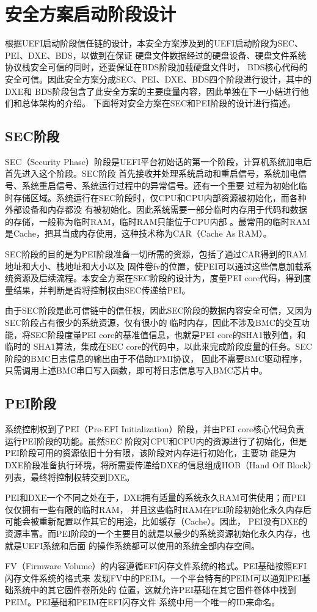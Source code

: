 %
%
\section{安全方案启动阶段设计}
根据UEFI启动阶段信任链的设计，本安全方案涉及到的UEFI启动阶段为SEC、PEI、DXE、BDS，以做到在保证
硬盘文件数据经过的硬盘设备、硬盘文件系统协议栈安全可信的同时，还要保证在BDS阶段加载硬盘文件时，
BDS核心代码的安全可信。因此安全方案分成SEC、PEI、DXE、BDS四个阶段进行设计\cite{english1}，其中的DXE和
BDS阶段包含了此安全方案的主要度量内容，因此单独在下一小结进行他们和总体架构的介绍。
下面将对安全方案在SEC和PEI阶段的设计进行描述。

\subsection{SEC阶段}
SEC（Security Phase）阶段是UEFI平台初始话的第一个阶段，计算机系统加电后首先进入这个阶段。SEC阶段
首先接收并处理系统启动和重启信号，系统加电信号、系统重启信号、系统运行过程中的异常信号。还有一个重要
过程为初始化临时存储区域。系统运行在SEC阶段时，仅CPU和CPU内部资源被初始化，而各种外部设备和内存都没
有被初始化。因此系统需要一部分临时内存用于代码和数据的存储，一般称为临时RAM，临时RAM只能位于CPU内部
。最常用的临时RAM是Cache，把其当成内存使用，这种技术称为CAR（Cache As RAM）。
\par SEC阶段的目的是为PEI阶段准备一切所需的资源，包括了通过CAR得到的RAM地址和大小、栈地址和大小以及
固件卷fv的位置，使PEI可以通过这些信息加载系统资源及后续流程。本安全方案在SEC阶段的设计为，度量PEI 
core代码，得到度量结果，并判断是否将控制权由SEC传递给PEI。

\par 由于SEC阶段是此可信链中的信任根，因此SEC阶段的数据内容安全可信，又因为SEC阶段占有很少的系统资源，仅有很小的
临时内存，因此不涉及BMC的交互功能，将SEC阶段度量PEI core的基准值信息，也就是PEI core的SHA1散列值，和临时的
SHA1算法，集成在SEC core的代码中，以此来完成阶段度量的任务。SEC阶段的BMC日志信息的输出由于不借助IPMI协议，
因此不需要BMC驱动程序，只需调用上述BMC串口写入函数，即可将日志信息写入BMC芯片中。

\subsection{PEI阶段}
系统控制权到了PEI（Pre-EFI Initialization）阶段，并由PEI core核心代码负责运行PEI阶段的功能。虽然SEC
阶段对CPU和CPU内的资源进行了初始化，但是PEI阶段可用的资源依旧十分有限，该阶段对内存进行初始化，主要功
能是为DXE阶段准备执行环境，将所需要传递给DXE的信息组成HOB（Hand Off Block）列表，最终将控制权转交到DXE。
\par PEI和DXE一个不同之处在于，DXE拥有适量的系统永久RAM可供使用；而PEI仅仅拥有一些有限的临时RAM，
并且这些临时RAM在PEI阶段初始化永久内存后可能会被重新配置以作其它的用途，比如缓存（Cache）。因此，
PEI没有DXE的资源丰富。而PEI阶段的一个主要目的就是以最少的系统资源初始化永久内存，也就是UEFI系统和后面
的操作系统都可以使用的系统全部内存空间。
\par FV（Firmware Volume）的内容遵循EFI闪存文件系统的格式。PEI基础按照EFI闪存文件系统的格式来
发现FV中的PEIM。一个平台特有的PEIM可以通知PEI基础系统中的其它固件卷所处的
位置，这就允许PEI基础在其它固件卷体中找到PEIM。PEI基础和PEIM在EFI闪存文件
系统中用一个唯一的ID来命名。

